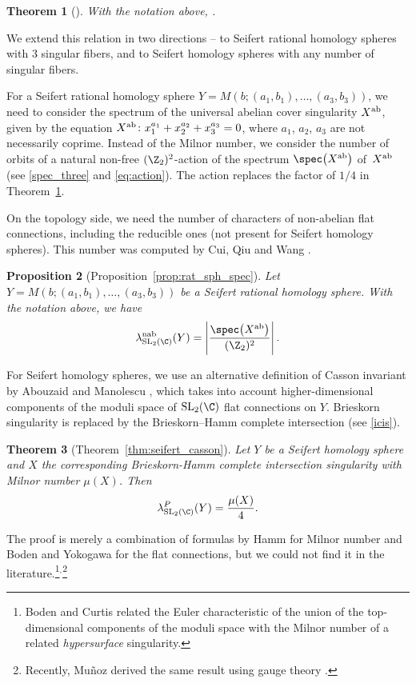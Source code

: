 \documentclass[pdftex]{sigma}
\newtheorem{Theorem}{Theorem}[section]
\newtheorem{Proposition}[Theorem]{Proposition}
\begin{document}
\begin{Theorem}[{\cite[Theorem~2.4.]{BC06}}]\label{CassonMilnorIntro}
With the notation above,
.
\end{Theorem}

We extend this relation in two directions -- to Seifert rational homology spheres with 3 singular fibers, and to Seifert homology spheres with any number of singular fibers.

For a Seifert rational homology sphere $Y = M(b;(a_1, b_1), \dots, (a_3,b_3))$, we need to consider the spectrum of the universal abelian cover singularity $X^{\rm ab}$, given by the equation
$
 X^{\rm ab}\colon x_1^{a_1}+x_2^{a_2}+x_3^{a_3}=0$,
where $a_1$, $a_2$, $a_3$ are not necessarily coprime. Instead of the Milnor number, we consider the number of orbits of a natural non-free $(\Z_2)^2$-action of the spectrum $\spec\bigl(X^{\rm ab}\bigr)$ of~$X^{\rm ab}$ (see \eqref{spec_three} and \eqref{eq:action}). The action replaces the factor of $1/4$ in Theorem~\ref{CassonMilnorIntro}.

On the topology side, we need the number  of characters of non-abelian flat connections, including the reducible ones (not present for Seifert homology spheres). This number was computed by Cui, Qiu and Wang \cite{CuQiWa21}.

\begin{Proposition}[Proposition~\ref{prop:rat_sph_spec}]
Let $Y = M(b;(a_1, b_1), \dots, (a_3,b_3))$ be a Seifert rational homology sphere. With the notation above, we have
\[
	\lambda^{\rm nab}_{\operatorname{SL}_2(\C)}(Y) =\left\lvert\frac{\spec\bigl(X^{\rm ab}\bigr)}{(\Z_2)^2}\right\rvert.
\]
\end{Proposition}


For Seifert homology spheres, we use an alternative definition of Casson invariant  by Abouzaid and Manolescu \cite{AbMa20}, which takes into account higher-dimensional components of the moduli space of $\operatorname{SL}_2(\C)$ flat connections on $Y$. Brieskorn singularity is replaced by the Brieskorn--Hamm complete intersection (see \eqref{icis}).
	\begin{Theorem}[Theorem~\ref{thm:seifert_casson}]
		Let $Y$ be a Seifert homology sphere and $X$ the corresponding Brieskorn-Hamm complete intersection singularity with Milnor number $\mu(X)$. Then
		\begin{equation}\label{casson_milnor_intro}
			\lambda^{P}_{\operatorname{SL}_2(\C)}(Y) = \frac{\mu(X)}{4}.	
		\end{equation}
	\end{Theorem}
The proof is merely a combination of formulas by Hamm \cite{Ham72} for Milnor number and Boden and Yokogawa \cite{BoYo96} for the flat connections, but we could not find it in the literature.\footnote{Boden and Curtis \cite[p.~10]{BC06} related the Euler characteristic of the union of the top-dimensional components of the moduli space with the Milnor number of a related \emph{hypersurface} singularity.}$^{,}$\footnote{Recently, Mu\~noz derived the same result using gauge theory \cite[Corollary B]{munoz25}.}
\end{document}
